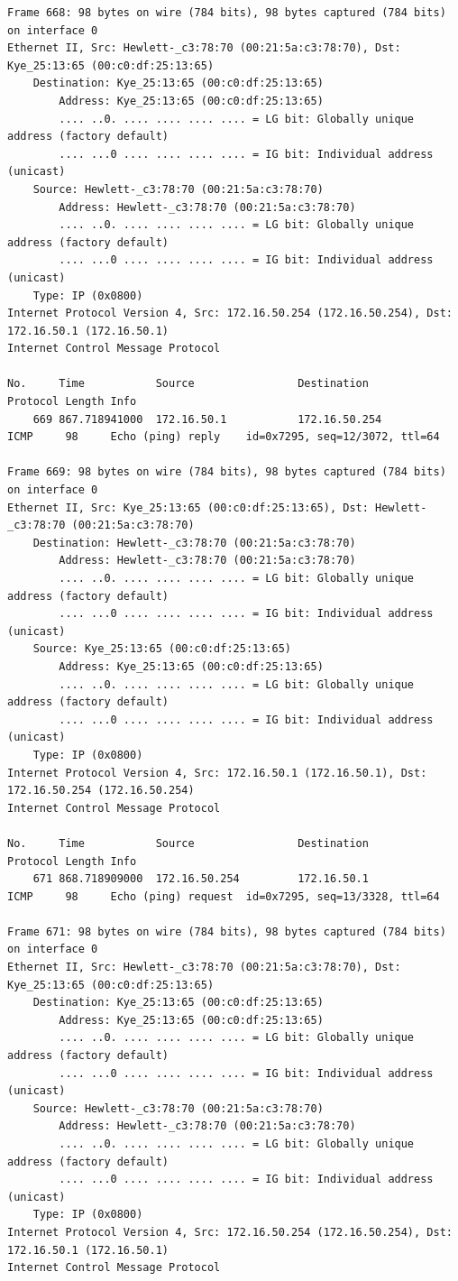 \documentclass[a4paper,11pt]{article}
\begin{document}
\begin{lstlisting}
Frame 668: 98 bytes on wire (784 bits), 98 bytes captured (784 bits) on interface 0
Ethernet II, Src: Hewlett-_c3:78:70 (00:21:5a:c3:78:70), Dst: Kye_25:13:65 (00:c0:df:25:13:65)
    Destination: Kye_25:13:65 (00:c0:df:25:13:65)
        Address: Kye_25:13:65 (00:c0:df:25:13:65)
        .... ..0. .... .... .... .... = LG bit: Globally unique address (factory default)
        .... ...0 .... .... .... .... = IG bit: Individual address (unicast)
    Source: Hewlett-_c3:78:70 (00:21:5a:c3:78:70)
        Address: Hewlett-_c3:78:70 (00:21:5a:c3:78:70)
        .... ..0. .... .... .... .... = LG bit: Globally unique address (factory default)
        .... ...0 .... .... .... .... = IG bit: Individual address (unicast)
    Type: IP (0x0800)
Internet Protocol Version 4, Src: 172.16.50.254 (172.16.50.254), Dst: 172.16.50.1 (172.16.50.1)
Internet Control Message Protocol

No.     Time           Source                Destination           Protocol Length Info
    669 867.718941000  172.16.50.1           172.16.50.254         ICMP     98     Echo (ping) reply    id=0x7295, seq=12/3072, ttl=64

Frame 669: 98 bytes on wire (784 bits), 98 bytes captured (784 bits) on interface 0
Ethernet II, Src: Kye_25:13:65 (00:c0:df:25:13:65), Dst: Hewlett-_c3:78:70 (00:21:5a:c3:78:70)
    Destination: Hewlett-_c3:78:70 (00:21:5a:c3:78:70)
        Address: Hewlett-_c3:78:70 (00:21:5a:c3:78:70)
        .... ..0. .... .... .... .... = LG bit: Globally unique address (factory default)
        .... ...0 .... .... .... .... = IG bit: Individual address (unicast)
    Source: Kye_25:13:65 (00:c0:df:25:13:65)
        Address: Kye_25:13:65 (00:c0:df:25:13:65)
        .... ..0. .... .... .... .... = LG bit: Globally unique address (factory default)
        .... ...0 .... .... .... .... = IG bit: Individual address (unicast)
    Type: IP (0x0800)
Internet Protocol Version 4, Src: 172.16.50.1 (172.16.50.1), Dst: 172.16.50.254 (172.16.50.254)
Internet Control Message Protocol

No.     Time           Source                Destination           Protocol Length Info
    671 868.718909000  172.16.50.254         172.16.50.1           ICMP     98     Echo (ping) request  id=0x7295, seq=13/3328, ttl=64

Frame 671: 98 bytes on wire (784 bits), 98 bytes captured (784 bits) on interface 0
Ethernet II, Src: Hewlett-_c3:78:70 (00:21:5a:c3:78:70), Dst: Kye_25:13:65 (00:c0:df:25:13:65)
    Destination: Kye_25:13:65 (00:c0:df:25:13:65)
        Address: Kye_25:13:65 (00:c0:df:25:13:65)
        .... ..0. .... .... .... .... = LG bit: Globally unique address (factory default)
        .... ...0 .... .... .... .... = IG bit: Individual address (unicast)
    Source: Hewlett-_c3:78:70 (00:21:5a:c3:78:70)
        Address: Hewlett-_c3:78:70 (00:21:5a:c3:78:70)
        .... ..0. .... .... .... .... = LG bit: Globally unique address (factory default)
        .... ...0 .... .... .... .... = IG bit: Individual address (unicast)
    Type: IP (0x0800)
Internet Protocol Version 4, Src: 172.16.50.254 (172.16.50.254), Dst: 172.16.50.1 (172.16.50.1)
Internet Control Message Protocol


\end{lstlisting}
\end{document}
